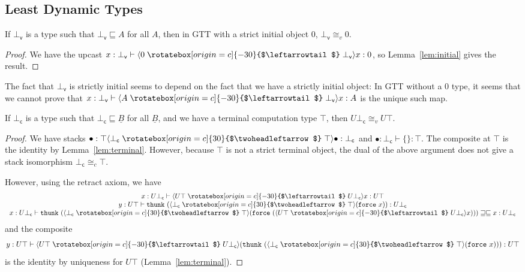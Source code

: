 \documentclass[acmsmall,nonacm]{acmart}
\renewcommand{\u}{\underline}
\newcommand{\ltdyn}{\sqsubseteq}
\newcommand{\gtdyn}{\sqsupseteq}
\newcommand{\equidyn}{\mathrel{\gtdyn\ltdyn}}
\newcommand{\uarrow}{\mathrel{\rotatebox[origin=c]{-30}{$\leftarrowtail$}}}
\newcommand{\darrow}{\mathrel{\rotatebox[origin=c]{30}{$\twoheadleftarrow$}}}
\newcommand{\upcast}[2]{\langle{#2}\uarrow{#1}\rangle}
\newcommand{\dncast}[2]{\langle{#1}\darrow{#2}\rangle}
\newcommand{\kw}[1]{\texttt{#1}\,\,}
\newcommand{\thunk}{\kw{thunk}}
\newcommand{\force}{\kw{force}}
\newcommand\leastdynv[0]{\bot_{\mathsf{v}}}
\newcommand\leastdync[0]{\bot_{\mathsf{c}}}
\begin{document}
\begin{longonly}
\subsection{Least Dynamic Types}

\begin{longonly}
\begin{theorem}
  If $\leastdynv$ is a type such that $\leastdynv \ltdyn A$ for all $A$,
  then in GTT with a strict initial object $0$, $\leastdynv \cong_{v}
  0$.
\end{theorem}
\begin{proof}
We have the upcast $x : \leastdynv \vdash \upcast{\leastdynv}{0}{x} :
0$, so Lemma~\ref{lem:initial} gives the result.
\end{proof}
The fact that $\leastdynv$ is strictly initial seems to depend on the
fact that we have a strictly initial object: In GTT without a $0$ type,
it seems that we cannot prove that $x : \leastdynv \vdash
\upcast{\leastdynv}{A}{x} : A$ is the unique such map.  

\begin{theorem}
If $\leastdync$ is a type such that $\leastdync \ltdyn \u B$ for all $\u
B$, and we have a terminal computation type $\top$, then $U \leastdync
\cong_{v} U \top$.
\end{theorem}
\begin{proof}
We have stacks $\bullet : \top \dncast{\leastdync}{\top}{\bullet} :
\leastdync$ and $\bullet : \leastdync \vdash \{\} : \top$.  The
composite at $\top$ is the identity by Lemma~\ref{lem:terminal}.  However,
because $\top$ is not a strict terminal object, the dual of the above
argument does not give a stack isomorphism $\leastdync \cong_c \top$.

However, using the retract axiom, we have
\[
\begin{array}{c}
  x : U \leastdync \vdash \upcast{U \leastdync}{U \top}{x} : U \top\\
  y : U \top \vdash \thunk{(\dncast{\leastdync}{\top}{(\force{x})})} : U \leastdync\\
  x : U \leastdync \vdash \thunk{(\dncast{\leastdync}{\top}{(\force{(\upcast{U \leastdync}{U \top}{x})})})} \equidyn x : U \leastdync
\end{array}
\]
and the composite 
\[
y : U \top \vdash \upcast{U \leastdync}{U \top}{(\thunk{(\dncast{\leastdync}{\top}{(\force{x})})})} : U \top
\]
is the identity by uniqueness for $U \top$ (Lemma~\ref{lem:terminal}).  
\end{proof}


\end{longonly}
\end{longonly}
\end{document}

